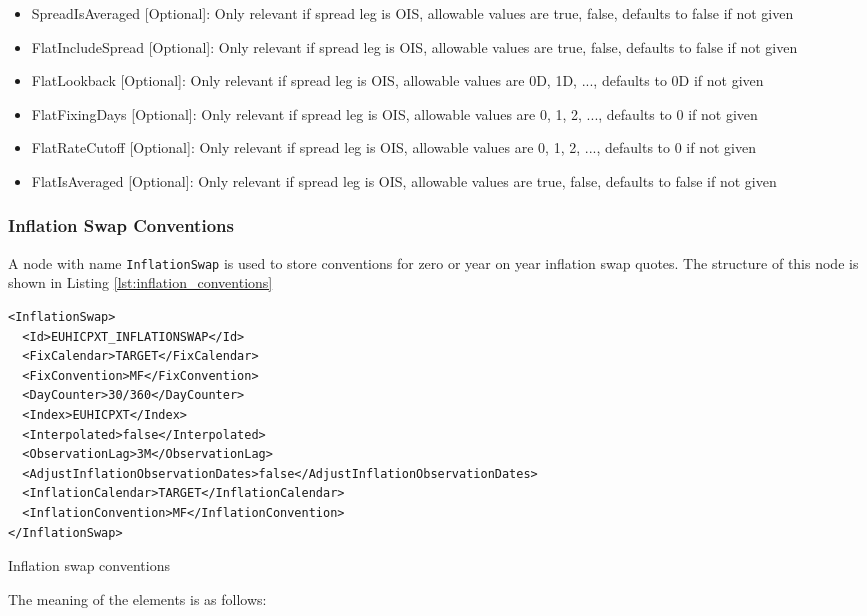\begin{itemize}
\item SpreadIsAveraged [Optional]: Only relevant if spread leg is OIS, allowable values are true, false, defaults to false if not given
\item FlatIncludeSpread [Optional]: Only relevant if spread leg is OIS, allowable values are true, false, defaults to false if not given
\item FlatLookback [Optional]: Only relevant if spread leg is OIS, allowable values are 0D, 1D, ..., defaults to 0D if not given
\item FlatFixingDays [Optional]: Only relevant if spread leg is OIS, allowable values are 0, 1, 2, ..., defaults to 0 if not given
\item FlatRateCutoff [Optional]: Only relevant if spread leg is OIS, allowable values are 0, 1, 2, ..., defaults to 0 if not given
\item FlatIsAveraged [Optional]: Only relevant if spread leg is OIS, allowable values are true, false, defaults to false if not given
\end{itemize}

\subsubsection{Inflation Swap Conventions}
A node with name \lstinline!InflationSwap! is used to store conventions for zero or year on year inflation swap quotes. The structure of this node is shown in Listing \ref{lst:inflation_conventions}

\begin{listing}[H]
\begin{verbatim}
<InflationSwap>
  <Id>EUHICPXT_INFLATIONSWAP</Id>
  <FixCalendar>TARGET</FixCalendar>
  <FixConvention>MF</FixConvention>
  <DayCounter>30/360</DayCounter>
  <Index>EUHICPXT</Index>
  <Interpolated>false</Interpolated>
  <ObservationLag>3M</ObservationLag>
  <AdjustInflationObservationDates>false</AdjustInflationObservationDates>
  <InflationCalendar>TARGET</InflationCalendar>
  <InflationConvention>MF</InflationConvention>
</InflationSwap>
\end{verbatim}
\caption{Inflation swap conventions}
\label{lst:inflation_conventions}
\end{listing}

The meaning of the elements is as follows:

